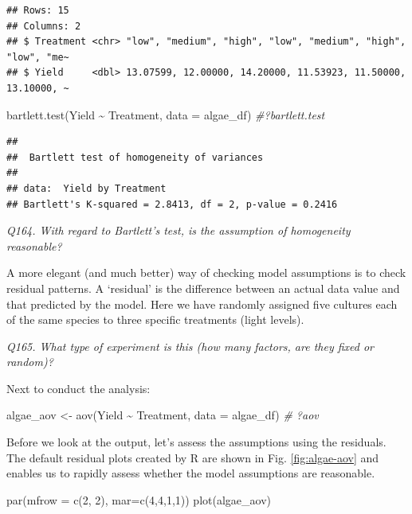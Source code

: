 \documentclass[
  11pt,
  a4paper,
]{book}
\newenvironment{Shaded}{\begin{snugshade}}{\end{snugshade}}
\newcommand{\AttributeTok}[1]{\textcolor[rgb]{0.77,0.63,0.00}{#1}}
\newcommand{\CommentTok}[1]{\textcolor[rgb]{0.56,0.35,0.01}{\textit{#1}}}
\newcommand{\DecValTok}[1]{\textcolor[rgb]{0.00,0.00,0.81}{#1}}
\newcommand{\FunctionTok}[1]{\textcolor[rgb]{0.00,0.00,0.00}{#1}}
\newcommand{\NormalTok}[1]{#1}
\newcommand{\OtherTok}[1]{\textcolor[rgb]{0.56,0.35,0.01}{#1}}
\newcommand{\SpecialCharTok}[1]{\textcolor[rgb]{0.00,0.00,0.00}{#1}}
\begin{document}
\begin{verbatim}
## Rows: 15
## Columns: 2
## $ Treatment <chr> "low", "medium", "high", "low", "medium", "high", "low", "me~
## $ Yield     <dbl> 13.07599, 12.00000, 14.20000, 11.53923, 11.50000, 13.10000, ~
\end{verbatim}

\begin{Shaded}
\begin{Highlighting}[]
\FunctionTok{bartlett.test}\NormalTok{(Yield }\SpecialCharTok{\textasciitilde{}}\NormalTok{ Treatment, }\AttributeTok{data =}\NormalTok{ algae\_df) }\CommentTok{\#?bartlett.test}
\end{Highlighting}
\end{Shaded}

\begin{verbatim}
## 
##  Bartlett test of homogeneity of variances
## 
## data:  Yield by Treatment
## Bartlett's K-squared = 2.8413, df = 2, p-value = 0.2416
\end{verbatim}

\emph{Q164. With regard to Bartlett's test, is the assumption of homogeneity reasonable?}

A more elegant (and much better) way of checking model assumptions is to check residual patterns. A `residual' is the difference between an actual data value and that predicted by the model. Here we have randomly assigned five cultures each of the same species to three specific treatments (light levels).

\emph{Q165. What type of experiment is this (how many factors, are they fixed or random)?}

Next to conduct the analysis:

\begin{Shaded}
\begin{Highlighting}[]
\NormalTok{algae\_aov }\OtherTok{\textless{}{-}} \FunctionTok{aov}\NormalTok{(Yield }\SpecialCharTok{\textasciitilde{}}\NormalTok{ Treatment, }\AttributeTok{data =}\NormalTok{ algae\_df) }\CommentTok{\# ?aov}
\end{Highlighting}
\end{Shaded}

Before we look at the output, let's assess the assumptions using the residuals. The default residual plots created by R are shown in Fig. \ref{fig:algae-aov} and enables us to rapidly assess whether the model assumptions are reasonable.

\begin{Shaded}
\begin{Highlighting}[]
\FunctionTok{par}\NormalTok{(}\AttributeTok{mfrow =} \FunctionTok{c}\NormalTok{(}\DecValTok{2}\NormalTok{, }\DecValTok{2}\NormalTok{), }\AttributeTok{mar=}\FunctionTok{c}\NormalTok{(}\DecValTok{4}\NormalTok{,}\DecValTok{4}\NormalTok{,}\DecValTok{1}\NormalTok{,}\DecValTok{1}\NormalTok{)) }
\FunctionTok{plot}\NormalTok{(algae\_aov) }
\end{Highlighting}
\end{Shaded}
\end{document}
